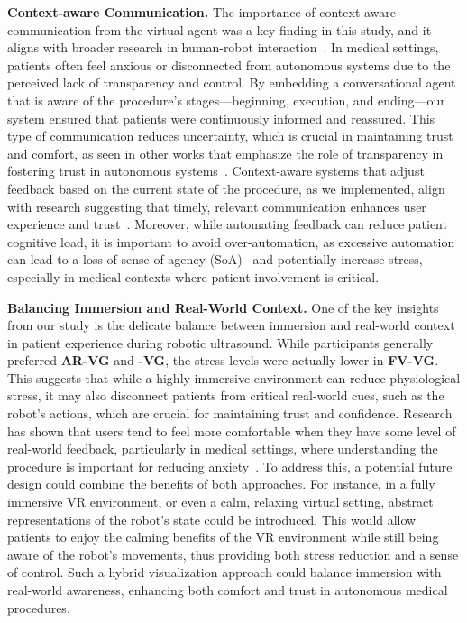 \textbf{Context-aware Communication.}
The importance of context-aware communication from the virtual agent was a key finding in this study, and it aligns with broader research in human-robot interaction~\cite{chevalier2022context}. In medical settings, patients often feel anxious or disconnected from autonomous systems due to the perceived lack of transparency and control. By embedding a conversational agent that is aware of the procedure’s stages—beginning, execution, and ending—our system ensured that patients were continuously informed and reassured. This type of communication reduces uncertainty, which is crucial in maintaining trust and comfort, as seen in other works that emphasize the role of transparency in fostering trust in autonomous systems~\cite{ososky2014determinants,pynadath2018transparency}. Context-aware systems that adjust feedback based on the current state of the procedure, as we implemented, align with research suggesting that timely, relevant communication enhances user experience and trust~\cite{lisetti2015now}. Moreover, while automating feedback can reduce patient cognitive load, it is important to avoid over-automation, as excessive automation can lead to a loss of sense of agency (SoA)~\cite{haggard2012sense,ueda2021influence} and potentially increase stress, especially in medical contexts where patient involvement is critical.

 
\textbf{Balancing Immersion and Real-World Context.}
One of the key insights from our study is the delicate balance between immersion and real-world context in patient experience during robotic ultrasound. While participants generally preferred \textbf{AR-VG} and \textbf{-VG}, the stress levels were actually lower in \textbf{FV-VG}. This suggests that while a highly immersive environment can reduce physiological stress, it may also disconnect patients from critical real-world cues, such as the robot’s actions, which are crucial for maintaining trust and confidence. Research has shown that users tend to feel more comfortable when they have some level of real-world feedback, particularly in medical settings, where understanding the procedure is important for reducing anxiety~\cite{burghardt2018non,weisfeld2021dealing}. To address this, a potential future design could combine the benefits of both approaches. For instance, in a fully immersive VR environment, or even a calm, relaxing virtual setting, abstract representations of the robot’s state could be introduced. This would allow patients to enjoy the calming benefits of the VR environment while still being aware of the robot’s movements, thus providing both stress reduction and a sense of control. Such a hybrid visualization approach could balance immersion with real-world awareness, enhancing both comfort and trust in autonomous medical procedures.

